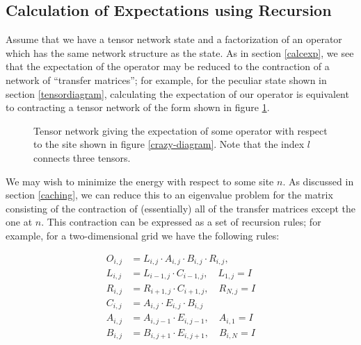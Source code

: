 \documentclass[12pt]{amsbook}
\theoremstyle{plain}
\theoremstyle{definition}
\theoremstyle{remark}
\begin{document}
\subsection{Calculation of Expectations using Recursion}

Assume that we have a tensor network state and a factorization of an operator which has the same network structure as the state.  As in section \ref{calcexp}, we see that the expectation of the operator may be reduced to the contraction of a network of ``transfer matrices'';  for example, for the peculiar state shown in section \ref{tensordiagram}, calculating the expectation of our operator is equivalent to contracting a tensor network of the form shown in figure \ref{crazy-transfer-matrix-network}.

\begin{figure}
\centering
{}
\caption{\label{crazy-transfer-matrix-network} Tensor network giving the expectation of some operator with respect to the site shown in figure \ref{crazy-diagram}.  Note that the index $l$ connects three tensors.}
\end{figure}

We may wish to minimize the energy with respect to some site $n$.  As discussed in section \ref{caching}, we can reduce this to an eigenvalue problem for the matrix consisting of the contraction of (essentially) all of the transfer matrices except the one at $n$.  This contraction can be expressed as a set of recursion rules;  for example, for a two-dimensional grid we have the following rules:

$$
\begin{aligned}
O_{i,j} &= L_{i,j} \cdot A_{i,j} \cdot B_{i,j} \cdot R_{i,j}, \\
L_{i,j} &= L_{i-1,j}\cdot C_{i-1,j}, \quad L_{1,j} = I \\
R_{i,j} &= R_{i+1,j}\cdot C_{i+1,j}, \quad R_{N,j} = I \\
C_{i,j} &= A_{i,j}\cdot E_{i,j} \cdot B_{i,j} \\
A_{i,j} &= A_{i,j-1}\cdot E_{i,j-1}, \quad A_{i,1} = I \\
B_{i,j} &= B_{i,j+1}\cdot E_{i,j+1}, \quad B_{i,N} = I \\
\end{aligned}
$$
\end{document}
